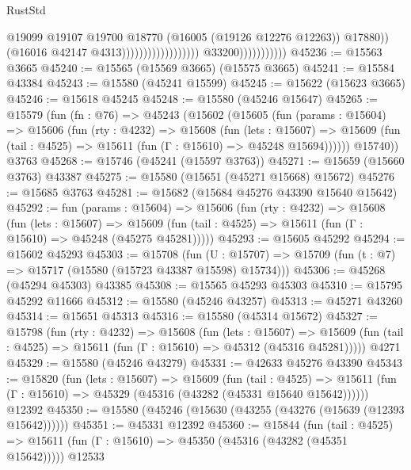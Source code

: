 \begin{lexlean}{RustStd}
\begin{coremodule}
                                                                @19099
                                                                @19107
                                                                @19700
                                                                @18770
                                                                (@16005 (@19126 @12276 @12263))
                                                                @17880))
                                                            (@16016 @42147 @4313))))))))))))))))))
                          @33200)))))))))))
@45236 := @15563 @3665
@45240 := @15565 (@15569 @3665) (@15575 @3665)
@45241 := @15584 @43384
@45243 := @15580 (@45241 @15599)
@45245 := @15622 (@15623 @3665)
@45246 := @15618 @45245
@45248 := @15580 (@45246 @15647)
@45265 := @15579
    (fun (fn : @76) =>
    @45243
      (@15602
        (@15605
          (fun (params : @15604) =>
          @15606
            (fun (rty : @4232) =>
            @15608
              (fun (lets : @15607) =>
              @15609 (fun (tail : @4525) => @15611 (fun (Γ : @15610) => @45248 @15694))))))
        @15740))
    @3763
@45268 := @15746 (@45241 (@15597 @3763))
@45271 := @15659 (@15660 @3763) @43387
@45275 := @15580 (@15651 (@45271 @15668) @15672)
@45276 := @15685 @3763
@45281 := @15682 (@15684 @45276 @43390 @15640 @15642)
@45292 := fun (params : @15604) =>
  @15606
    (fun (rty : @4232) =>
    @15608
      (fun (lets : @15607) =>
      @15609 (fun (tail : @4525) => @15611 (fun (Γ : @15610) => @45248 (@45275 @45281)))))
@45293 := @15605 @45292
@45294 := @15602 @45293
@45303 := @15708
    (fun (U : @15707) => @15709 (fun (t : @7) => @15717 (@15580 (@15723 @43387 @15598) @15734)))
@45306 := @45268 (@45294 @45303) @43385
@45308 := @15565 @45293 @45303
@45310 := @15795 @45292 @11666
@45312 := @15580 (@45246 @43257)
@45313 := @45271 @43260
@45314 := @15651 @45313
@45316 := @15580 (@45314 @15672)
@45327 := @15798
    (fun (rty : @4232) =>
    @15608
      (fun (lets : @15607) =>
      @15609 (fun (tail : @4525) => @15611 (fun (Γ : @15610) => @45312 (@45316 @45281)))))
    @4271
@45329 := @15580 (@45246 @43279)
@45331 := @42633 @45276 @43390
@45343 := @15820
    (fun (lets : @15607) =>
    @15609
      (fun (tail : @4525) =>
      @15611 (fun (Γ : @15610) => @45329 (@45316 (@43282 (@45331 @15640 @15642))))))
    @12392
@45350 := @15580 (@45246 (@15630 (@43255 (@43276 (@15639 (@12393 @15642))))))
@45351 := @45331 @12392
@45360 := @15844
    (fun (tail : @4525) => @15611 (fun (Γ : @15610) => @45350 (@45316 (@43282 (@45351 @15642)))))
    @12533

\end{coremodule}
\end{lexlean}
